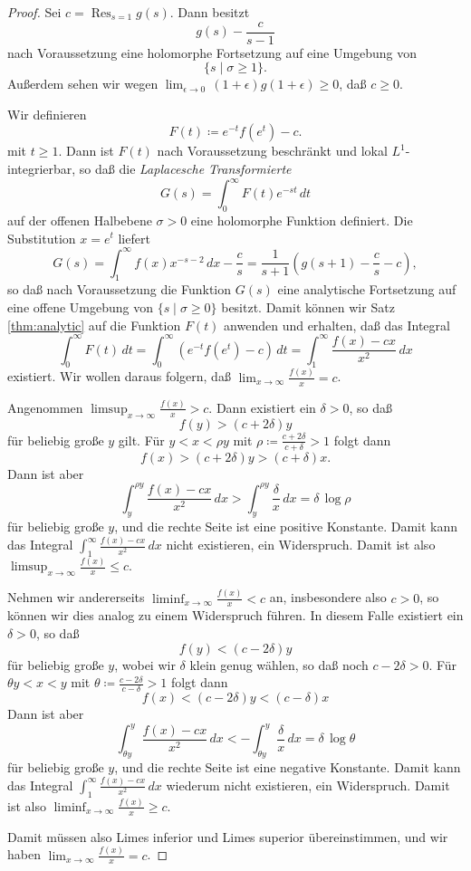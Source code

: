 \documentclass[a4paper,twoside,openright]{report}
\theoremstyle{definition}
\theoremstyle{remark}
\DeclareMathOperator{\Res}{Res}
\begin{document}
\begin{proof}
  Sei $c = \Res_{s = 1} g(s)$. Dann besitzt
  \[
    g(s) - \frac c{s - 1}
  \]
  nach Voraussetzung
  eine holomorphe Fortsetzung auf eine Umgebung von
  \[
    \{s \mid \sigma \ge 1\}.
  \]
  Außerdem sehen wir wegen $\lim_{\epsilon \to 0} \, (1 + \epsilon) g(1 + \epsilon) \ge 0$, 
  daß $c \ge 0$.
  
  Wir definieren
  \[
    F(t) \coloneqq e^{-t} f(e^t) - c.
  \]
  mit $t \ge 1$. Dann ist $F(t)$ nach Voraussetzung beschränkt und
  lokal $L^1$-integrier\-bar, so daß die
  \emph{Laplacesche Transformierte}
  \[
    G(s) = \int_0^\infty F(t) e^{-s t} \, dt
  \]
  auf der offenen Halbebene $\sigma > 0$ eine holomorphe Funktion definiert.
  Die Substitution $x = e^t$ liefert
  \[
    G(s) = \int_1^\infty f(x) x^{-s - 2} \, dx - \frac c s
    = \frac{1}{s + 1}\left(g(s + 1) - \frac c s - c\right),
  \] 
  so daß nach Voraussetzung die Funktion $G(s)$ eine analytische Fortsetzung
  auf eine offene Umgebung von $\{s \mid \sigma \ge 0\}$ besitzt. Damit können
  wir Satz \ref{thm:analytic} auf die Funktion $F(t)$ anwenden und erhalten, daß
  das Integral
  \[
    \int_0^\infty F(t) \, dt = \int_0^\infty (e^{-t} f(e^t) - c) \, dt
    = \int_1^\infty \frac{f(x) - cx}{x^2} \, dx
  \]
  existiert. Wir wollen daraus folgern, daß $\lim_{x \to \infty} \frac{f(x)}{x} = c$.
  
  Angenommen $\limsup_{x \to \infty} \frac{f(x)}{x} > c$. Dann existiert ein
  $\delta > 0$, so daß
  \[
    f(y) > (c + 2 \delta) y
  \]
  für beliebig große $y$ gilt. Für $y < x < \rho y$ mit $\rho \coloneqq \frac{c + 2\delta}{c + \delta} > 1$
  folgt dann
  \[
    f(x) > (c + 2 \delta) y > (c + \delta) x.
  \]
  Dann ist aber
  \[
    \int_y^{\rho y} \frac{f(x) - cx}{x^2} \, dx > \int_y^{\rho y} \frac \delta x \, dx
    = \delta \, \log \rho
  \]
  für beliebig große $y$,
  und die rechte Seite ist eine positive Konstante. Damit kann das Integral
  $\int_1^\infty \frac{f(x) - cx}{x^2} \, dx$ nicht existieren, ein Widerspruch.
  Damit ist also $\limsup_{x \to \infty} \frac{f(x)}{x} \leq c$.
  
  Nehmen wir andererseits $\liminf_{x \to \infty} \frac{f(x)}{x} < c$ an, insbesondere
  also $c > 0$, so
  können wir dies analog zu einem Widerspruch führen. In diesem Falle existiert
  ein $\delta > 0$, so daß
  \[
    f(y) < (c - 2 \delta) y
  \]
  für beliebig große $y$, wobei wir $\delta$ klein genug wählen, so daß
  noch $c - 2 \delta > 0$. Für $\theta y < x < y$ mit $\theta \coloneqq \frac{c - 2 \delta}{c - \delta} > 1$
  folgt dann
  \[
    f(x) < (c - 2 \delta) y < (c - \delta) x
  \] 
  Dann ist aber
  \[
    \int_{\theta y}^y \frac{f(x) - cx}{x^2} \, dx < - \int_{\theta y}^y \frac \delta x \, dx
    = \delta \, \log \theta
  \] 
  für beliebig große $y$,
  und die rechte Seite ist eine negative Konstante. Damit kann das Integral
  $\int_1^\infty \frac{f(x) - cx}{x^2} \, dx$ wiederum nicht existieren, ein Widerspruch.
  Damit ist also $\liminf_{x \to \infty} \frac{f(x)}{x} \geq c$.
  
  Damit müssen also Limes inferior und Limes superior übereinstimmen, und wir
  haben $\lim_{x \to \infty} \frac{f(x)} x = c$.
\end{proof}
\end{document}
